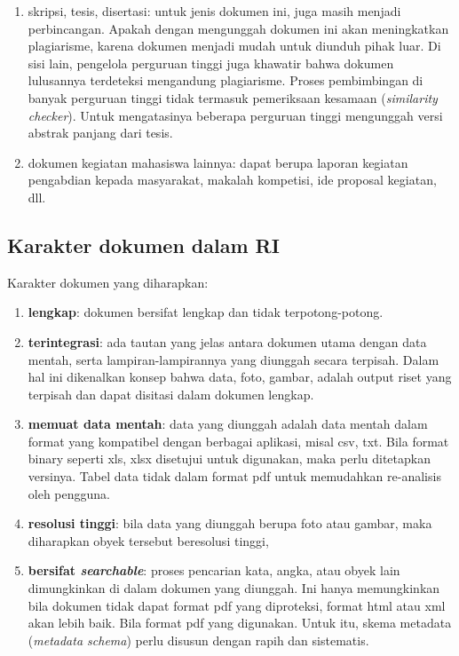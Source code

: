 \documentclass[a4paper]{article}
\begin{document}
\begin{enumerate}
\item skripsi, tesis, disertasi: untuk jenis dokumen ini, juga masih menjadi perbincangan. Apakah dengan mengunggah dokumen ini akan meningkatkan plagiarisme, karena dokumen menjadi mudah untuk diunduh pihak luar. Di sisi lain, pengelola perguruan tinggi juga khawatir bahwa dokumen lulusannya terdeteksi mengandung plagiarisme. Proses pembimbingan di banyak perguruan tinggi tidak termasuk pemeriksaan kesamaan (\textit{similarity checker}). Untuk mengatasinya beberapa perguruan tinggi mengunggah versi abstrak panjang dari tesis.   

\item dokumen kegiatan mahasiswa lainnya: dapat berupa laporan kegiatan pengabdian kepada masyarakat, makalah kompetisi, ide proposal kegiatan, dll.

\end{enumerate}

\subsection{Karakter dokumen dalam RI}

Karakter dokumen yang diharapkan:

\begin{enumerate}
\item \textbf{lengkap}: dokumen bersifat lengkap dan tidak terpotong-potong.

\item \textbf{terintegrasi}: ada tautan yang jelas antara dokumen utama dengan data mentah, serta lampiran-lampirannya yang diunggah secara terpisah. Dalam hal ini dikenalkan konsep bahwa data, foto, gambar, adalah output riset yang terpisah dan dapat disitasi dalam dokumen lengkap.

\item \textbf{memuat data mentah}: data yang diunggah adalah data mentah dalam format yang kompatibel dengan berbagai aplikasi, misal csv, txt. Bila format binary seperti xls, xlsx disetujui untuk digunakan, maka perlu ditetapkan versinya. Tabel data tidak dalam format pdf untuk memudahkan re-analisis oleh pengguna.

\item \textbf{resolusi tinggi}: bila data yang diunggah berupa foto atau gambar, maka diharapkan obyek tersebut beresolusi tinggi,

\item \textbf{bersifat \textit{searchable}}: proses pencarian kata, angka, atau obyek lain dimungkinkan di dalam dokumen yang diunggah. Ini hanya memungkinkan bila dokumen tidak dapat format pdf yang diproteksi, format html atau xml akan lebih baik. Bila format pdf yang digunakan. Untuk itu, skema metadata (\textit{metadata schema}) perlu disusun dengan rapih dan sistematis.

\end{enumerate}
\end{document}
